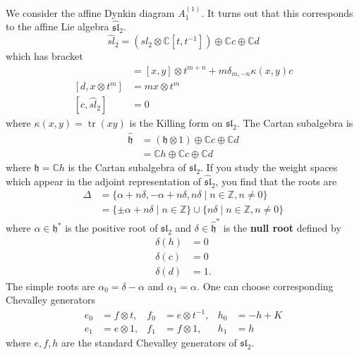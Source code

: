 \documentclass[12pt]{article}
\begin{document}
\begin{example}
    [Affine $\sl_2$] We consider the affine Dynkin diagram $A_1^{(1)}$. It turns out that this corresponds to the affine Lie algebra $\widehat{\mathfrak{sl}}_2$.
    \[\widehat{sl}_2 = (sl_2\otimes\mathbb C[t,t^{-1}]) \oplus \mathbb Cc \oplus \mathbb Cd\] which has bracket \begin{align*}
        [x\otimes t^m, y\otimes t^n] & = [x,y]\otimes t^{m+n} + m\delta_{m,-n}\kappa(x,y)c \\
        [d, x\otimes t^m]            & = m x\otimes t^m                                    \\
        [c, \widehat{sl}_2]          & = 0
    \end{align*} where $\kappa(x,y) = \operatorname{tr}(xy)$ is the Killing form on $\mathfrak{sl}_2$. The Cartan subalgebra is \begin{align*}
        \widehat{\mathfrak{h}} & = (\mathfrak{h}\otimes 1) \oplus \mathbb{C}c \oplus \mathbb{C}d \\
                               & = \mathbb{C}h \oplus \mathbb{C}c \oplus \mathbb{C}d
    \end{align*} where $\mathfrak{h} = \mathbb{C}h$ is the Cartan subalgebra of $\mathfrak{sl}_2$. If you study the weight spaces which appear in the adjoint representation of $\widehat{\mathfrak{sl}}_2$, you find that the roots are \begin{align*}
        \Delta & = \{\alpha + n\delta, -\alpha + n\delta, n\delta \mid n \in \mathbb{Z}, n \neq 0\}                \\
               & = \{\pm \alpha + n\delta \mid n \in \mathbb{Z}\} \cup \{n\delta \mid n \in \mathbb{Z}, n \neq 0\}
    \end{align*} where $\alpha \in \mathfrak{h}^*$ is the positive root of $\mathfrak{sl}_2$ and $\delta \in \widehat{\mathfrak{h}}^*$ is the \textbf{null root} defined by \begin{align*}
        \delta(h) & = 0  \\
        \delta(c) & = 0  \\
        \delta(d) & = 1.
    \end{align*} The simple roots are $\alpha_0 = \delta - \alpha$ and $\alpha_1 = \alpha$. One can choose corresponding Chevalley generators \begin{align*}
        e_0 & = f \otimes t, & f_0 & = e \otimes t^{-1}, & h_0 & = -h + K \\
        e_1 & = e \otimes 1, & f_1 & = f \otimes 1,     & h_1 & = h
    \end{align*} where $e,f,h$ are the standard Chevalley generators of $\mathfrak{sl}_2$. 


\end{example}
\end{document}
